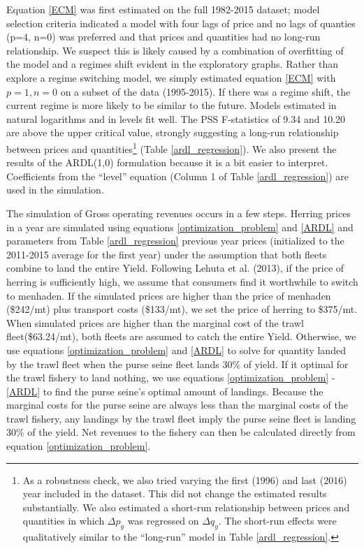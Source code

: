 \documentclass[]{article}
\let\rmarkdownfootnote\footnote%
\def\footnote{\protect\rmarkdownfootnote}
\begin{document}
Equation \ref{ECM} was first estimated on the full 1982-2015 dataset;
model selection criteria indicated a model with four lags of price and
no lags of quanties (p=4, n=0) was preferred and that prices and
quantities had no long-run relationship. We suspect this is likely
caused by a combination of overfitting of the model and a regimes shift
evident in the exploratory graphs. Rather than explore a regime
switching model, we simply estimated equation \ref{ECM} with
\(p=1, n=0\) on a subset of the data (1995-2015). If there was a regime
shift, the current regime is more likely to be similar to the future.
Models estimated in natural logarithms and in levels fit well. The PSS
F-statistics of 9.34 and 10.20 are above the upper critical value,
strongly suggesting a long-run relationship between prices and
quantities\footnote{As a robustness check, we also tried varying the
  first (1996) and last (2016) year included in the dataset. This did
  not change the estimated results substantially. We also estimated a
  short-run relationship between prices and quantities in which
  \(\Delta p_y\) was regressed on \(\Delta q_y\). The short-run effects
  were qualitatively similar to the ``long-run'' model in Table
  \ref{ardl_regression}.} (Table \ref{ardl_regression}). We also present
the results of the ARDL(1,0) formulation because it is a bit easier to
interpret. Coefficients from the ``level'' equation (Column 1 of Table
\ref{ardl_regression}) are used in the simulation.

The simulation of Gross operating revenues occurs in a few steps.
Herring prices in a year are simulated using equations
\ref{optimization_problem} and \ref{ARDL} and parameters from Table
\ref{ardl_regression} previous year prices (initialized to the 2011-2015
average for the first year) under the assumption that both fleets
combine to land the entire Yield. Following Lehuta et al. (2013), if the
price of herring is sufficiently high, we assume that consumers find it
worthwhile to switch to menhaden. If the simulated prices are higher
than the price of menhaden (\$242/mt) plus transport costs (\$133/mt),
we set the price of herring to \$375/mt. When simulated prices are
higher than the marginal cost of the trawl fleet(\$63.24/mt), both
fleets are assumed to catch the entire Yield. Otherwise, we use
equations \ref{optimization_problem} and \ref{ARDL} to solve for
quantity landed by the trawl fleet when the purse seine fleet lands 30\%
of yield. If it optimal for the trawl fishery to land nothing, we use
equations \ref{optimization_problem} - \ref{ARDL} to find the purse
seine's optimal amount of landings. Because the marginal costs for the
purse seine are always less than the marginal costs of the trawl
fishery, any landings by the trawl fleet imply the purse seine fleet is
landing 30\% of the yield. Net revenues to the fishery can then be
calculated directly from equation \ref{optimization_problem}.
\end{document}
